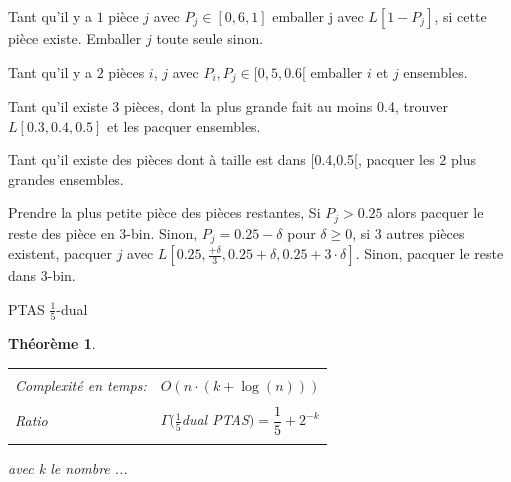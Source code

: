 \documentclass[a4paper,12pt]{report}
\theoremstyle{plain}				%
\newtheorem{theoreme}{Théorème}	%
\theoremstyle{definition}				%
\newcommand{\tdi}[1]{\todo[inline]{{#1}}{}}
\begin{document}
\begin{algorithm}[H]
\DontPrintSemicolon

Tant qu'il y a $1$ pièce $j$ avec $P_j \in [0,6, 1]$ emballer j avec $L[1 - P_j]$, si cette pièce existe. Emballer $j$ toute seule sinon.

\BlankLine %
Tant qu'il y a $2$ pièces $i$, $j$ avec $P_i, P_j \in [0,5, 0.6[$ emballer $i$ et $j$ ensembles.

\BlankLine %
Tant qu'il existe $3$ pièces, dont la plus grande fait au moins 0.4, trouver $L[0.3,0.4,0.5]$ et les pacquer ensembles.

\BlankLine %
Tant qu'il existe des pièces dont à taille est dans [0.4,0.5[, pacquer les $2$ plus grandes ensembles.

\BlankLine %
Prendre la plus petite pièce des pièces restantes, Si $P_j > 0.25$ 
alors pacquer le reste des pièce en 3-bin. 
Sinon, $P_j = 0.25 - \delta$ pour $\delta \geq 0$, 
 si $3$ autres pièces existent, pacquer $j$ 
 avec $L[0.25, \frac{+\delta}{3}, 0.25 + \delta, 0.25 + 3 \cdot \delta]$. 
Sinon, pacquer le reste dans 3-bin.


\caption{PTAS $\frac{1}{5}$-dual}
\label{algo:PTASDual1_5}
\end{algorithm}

\bigskip

\begin{theoreme}
\begin{flushleft}
\begin{tabular}{|p{8cm}p{6cm}|}
\hline
& \\
Complexité en temps:& $O(n \cdot (k + \log(n)))$
\\	%
& \\
Ratio & $\Gamma(\frac{1}{5}$dual PTAS$) = \dfrac{1}{5} + 2^{-k}$
\\
& \\
\hline
\end{tabular}
\end{flushleft}
avec k le nombre ...
\end{theoreme}
\tdi{FCO: Trouver k !}
\end{document}

